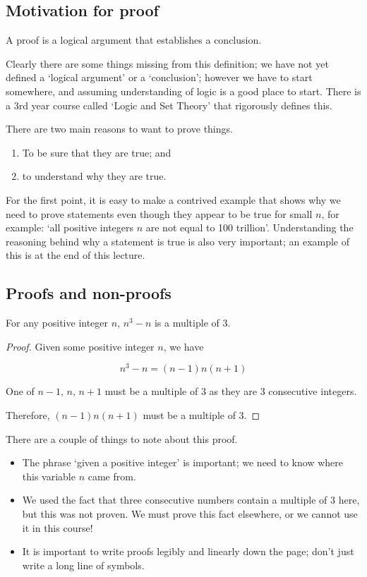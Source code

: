 \subsection{Motivation for proof}
\begin{definition}[Proof]
	A proof is a logical argument that establishes a conclusion.
\end{definition}

Clearly there are some things missing from this definition; we have not yet defined a `logical argument' or a `conclusion'; however we have to start somewhere, and assuming understanding of logic is a good place to start.
There is a 3rd year course called `Logic and Set Theory' that rigorously defines this.

There are two main reasons to want to prove things.
\begin{enumerate}
	\item To be sure that they are true; and
	\item to understand why they are true.
\end{enumerate}

For the first point, it is easy to make a contrived example that shows why we need to prove statements even though they appear to be true for small \(n\), for example: `all positive integers \(n\) are not equal to 100 trillion'.
Understanding the reasoning behind why a statement is true is also very important; an example of this is at the end of this lecture.

\subsection{Proofs and non-proofs}
\begin{claim}
	For any positive integer \(n\), \(n^3-n\) is a multiple of 3.
\end{claim}
\begin{proof}
	Given some positive integer \(n\), we have

	\[
		n^3 - n = (n-1)n(n+1)
	\]

	One of \(n-1,\,n,\,n+1\) must be a multiple of 3 as they are 3 consecutive integers.

	Therefore, \((n-1)n(n+1)\) must be a multiple of 3.
\end{proof}

There are a couple of things to note about this proof.
\begin{itemize}
	\item The phrase `given a positive integer' is important; we need to know where this variable \(n\) came from.
	\item We used the fact that three consecutive numbers contain a multiple of 3 here, but this was not proven.
	      We must prove this fact elsewhere, or we cannot use it in this course!
	\item It is important to write proofs legibly and linearly down the page; don't just write a long line of symbols.
\end{itemize}

